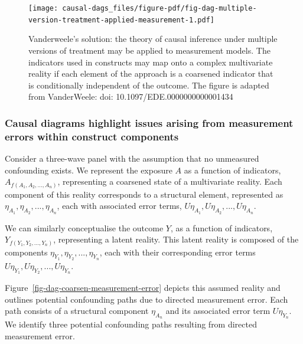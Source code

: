 \documentclass[
  singlecolumn]{article}
\begin{document}
\begin{figure}

{\centering \texttt{[image: causal-dags\_files/figure-pdf/fig-dag-multiple-version-treatment-applied-measurement-1.pdf]}

}

\caption{\label{fig-dag-multiple-version-treatment-applied-measurement}Vanderweele's
solution: the theory of causal inference under multiple versions of
treatment may be applied to measurement models. The indicators used in
constructs may map onto a complex multivariate reality if each element
of the approach is a coarsened indicator that is conditionally
independent of the outcome. The figure is adapted from VanderWeele: doi:
10.1097/EDE.0000000000001434}

\end{figure}

\hypertarget{causal-diagrams-highlight-issues-arising-from-measurement-errors-within-construct-components}{%
\subsubsection{Causal diagrams highlight issues arising from measurement
errors within construct
components}\label{causal-diagrams-highlight-issues-arising-from-measurement-errors-within-construct-components}}

Consider a three-wave panel with the assumption that no unmeasured
confounding exists. We represent the exposure \(A\) as a function of
indicators, \(A_{f(A_1, A_2, ..., A_n)}\), representing a coarsened
state of a multivariate reality. Each component of this reality
corresponds to a structural element, represented as
\(\eta_{A_1}, \eta_{A_2}, ..., \eta_{A_n}\), each with associated error
terms, \(U\eta_{A_1}, U\eta_{A_2}, ..., U\eta_{A_n}\).

We can similarly conceptualise the outcome \(Y\), as a function of
indicators, \(Y_{f(Y_1, Y_2, ..., Y_n)}\), representing a latent
reality. This latent reality is composed of the components
\(\eta_{Y_1}, \eta_{Y_2}, ..., \eta_{Y_n}\), each with their
corresponding error terms
\(U\eta_{Y_1}, U\eta_{Y_2}, ..., U\eta_{Y_n}\).

Figure~\ref{fig-dag-coarsen-measurement-error} depicts this assumed
reality and outlines potential confounding paths due to directed
measurement error. Each path consists of a structural component
\(\eta_{A_n}\) and its associated error term \(U\eta_{Y_n}\). We
identify three potential confounding paths resulting from directed
measurement error.
\end{document}
